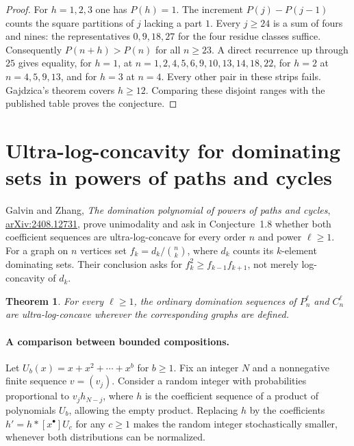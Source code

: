 \documentclass[11pt,a4paper]{article}
\newtheorem{theorem}{Theorem}[section]
\numberwithin{equation}{section}
\begin{document}
\begin{proof}
For $h=1,2,3$ one has $P(h)=1$. The increment $P(j)-P(j-1)$
counts the square partitions of $j$ lacking a part $1$. Every
$j\ge24$ is a sum of fours and nines: the representatives
$0,9,18,27$ for the four residue classes suffice. Consequently
$P(n+h)>P(n)$ for all $n\ge23$. A direct recurrence up through $25$
gives equality, for $h=1$, at $n=1,2,4,5,6,9,10,13,14,18,22$,
for $h=2$ at $n=4,5,9,13$, and for $h=3$ at $n=4$.
Every other pair in these strips fails. Gajdzica's theorem covers
$h\ge12$. Comparing these disjoint ranges with the published table
proves the conjecture.
\end{proof}

\section{Ultra-log-concavity for dominating sets in powers of paths and cycles}
\label{sec:gz-ulc}
Galvin and Zhang, \emph{The domination polynomial of powers of paths
and cycles}, \href{https://arxiv.org/abs/2408.12731}{arXiv:2408.12731},
prove unimodality and ask in Conjecture~1.8 whether both coefficient
sequences are ultra-log-concave for every order $n$ and power $\ell\ge1$.
For a graph on $n$ vertices set $f_k=d_k/\binom nk$, where $d_k$ counts
its $k$-element dominating sets. Their conclusion asks for
$f_k^2\ge f_{k-1}f_{k+1}$, not merely log-concavity of $d_k$.

\begin{theorem}\label{th:gz-ulc}
For every $\ell\ge1$, the ordinary domination sequences of $P_n^\ell$
and $C_n^\ell$ are ultra-log-concave wherever the corresponding
graphs are defined.
\end{theorem}

\paragraph{A comparison between bounded compositions.}
Let $U_b(x)=x+x^2+\cdots+x^b$ for $b\ge1$.
Fix an integer $N$ and a nonnegative finite sequence $v=(v_j)$.
Consider a random integer with probabilities proportional to
$v_j h_{N-j}$, where $h$ is the coefficient sequence of a product
of polynomials $U_b$, allowing the empty product. Replacing $h$ by
the coefficients $h'= h*[x^\bullet]U_c$ for any $c\ge1$ makes
the random integer stochastically smaller, whenever both distributions
can be normalized.
\end{document}

